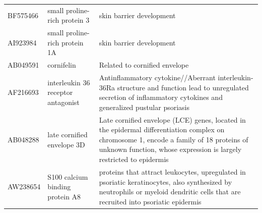 \documentclass[10pt,a4paper]{report}
\begin{document}
\begin{table}[]
\begin{tabular}{l|p{4.5cm} p{8.5cm}}
			BF575466           & small proline-rich protein 3                                                                                            & skin barrier development\cite{kainu2009association}                                                                                                                                                                                                                  \\
			AI923984           & small proline-rich protein 1A                                                                                           & skin barrier development\cite{bergboer2012genetics}                                                                                                                                                                                                                  \\
			AB049591           & cornifelin                                                                                                              & Related to cornified envelope\cite{michibata2004identification}                                                                                                                                                                                                             \\
			AF216693           & interleukin 36 receptor antagonist                                                                                      & Antinflammatory cytokine//Aberrant interleukin-36Ra structure and function lead to unregulated secretion of inflammatory cytokines and generalized pustular psoriasis\cite{marrakchi2011interleukin}                                                                     \\
			AB048288           & late cornified envelope 3D                                                                                              & Late cornified envelope (LCE) genes, located in the epidermal differentiation complex on chromosome 1, encode a family of 18 proteins of unknown function, whose expression is largely restricted to epidermis\cite{niehues2017psoriasis}                             \\
			AW238654           & S100 calcium binding protein A8                                                                                         & proteins that attract leukocytes, upregulated in psoriatic keratinocytes, also synthesized by neutrophils or myeloid dendritic cells that are recruited into psoriatic epidermis\cite{roberson2010psoriasis}                                                           \\

\end{tabular}
\end{table}
\end{document}
